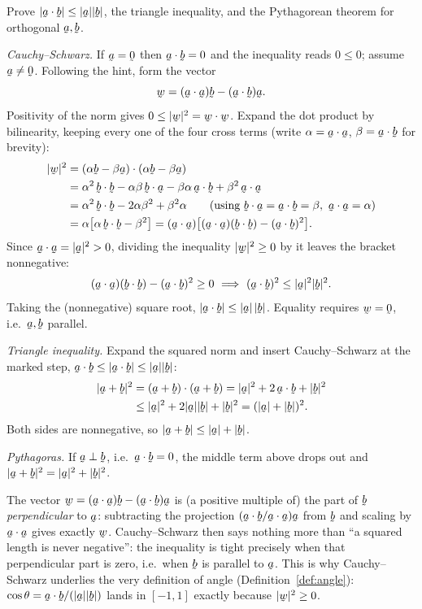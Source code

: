 \begin{problem}
Prove $|\ip\ba\bb|\le|\ba||\bb|$, the triangle inequality, and the
Pythagorean theorem for orthogonal $\ba,\bb$.
\end{problem}
\begin{solution}
\emph{Cauchy--Schwarz.} If $\ba=\bze$ then $\ip\ba\bb=0$ and the inequality
reads $0\le0$; assume $\ba\neq\bze$. Following the hint, form the vector
\[
\bw=(\ip\ba\ba)\bb-(\ip\ba\bb)\ba .
\]
Positivity of the norm gives $0\le|\bw|^2=\ip\bw\bw$. Expand the dot product
by bilinearity, keeping every one of the four cross terms (write
$\alpha=\ip\ba\ba$, $\beta=\ip\ba\bb$ for brevity):
\[
\begin{aligned}
|\bw|^2&=\ip{(\alpha\bb-\beta\ba)}{(\alpha\bb-\beta\ba)}\\
&=\alpha^2\,\ip\bb\bb-\alpha\beta\,\ip\bb\ba-\beta\alpha\,\ip\ba\bb
 +\beta^2\,\ip\ba\ba\\
&=\alpha^2\,\ip\bb\bb-2\alpha\beta^2+\beta^2\alpha
 \qquad(\text{using }\ip\bb\ba=\ip\ba\bb=\beta,\ \ip\ba\ba=\alpha)\\
&=\alpha\big[\alpha\,\ip\bb\bb-\beta^2\big]
 =(\ip\ba\ba)\big[(\ip\ba\ba)(\ip\bb\bb)-(\ip\ba\bb)^2\big].
\end{aligned}
\]
Since $\ip\ba\ba=|\ba|^2>0$, dividing the inequality $|\bw|^2\ge0$ by it
leaves the bracket nonnegative:
\[
(\ip\ba\ba)(\ip\bb\bb)-(\ip\ba\bb)^2\ge0
\ \Longrightarrow\ (\ip\ba\bb)^2\le|\ba|^2|\bb|^2 .
\]
Taking the (nonnegative) square root, $|\ip\ba\bb|\le|\ba|\,|\bb|$. Equality
requires $\bw=\bze$, i.e.\ $\ba,\bb$ parallel.

\emph{Triangle inequality.} Expand the squared norm and insert
Cauchy--Schwarz at the marked step, $\ip\ba\bb\le|\ip\ba\bb|\le|\ba||\bb|$:
\[
\begin{aligned}
|\ba+\bb|^2&=\ip{(\ba+\bb)}{(\ba+\bb)}=|\ba|^2+2\,\ip\ba\bb+|\bb|^2\\
&\le|\ba|^2+2|\ba||\bb|+|\bb|^2=(|\ba|+|\bb|)^2 .
\end{aligned}
\]
Both sides are nonnegative, so $|\ba+\bb|\le|\ba|+|\bb|$.

\emph{Pythagoras.} If $\ba\perp\bb$, i.e.\ $\ip\ba\bb=0$, the middle term
above drops out and $|\ba+\bb|^2=|\ba|^2+|\bb|^2$.
\end{solution}

\begin{remark}\label{rem:csuse}
The vector $\bw=(\ip\ba\ba)\bb-(\ip\ba\bb)\ba$ is (a positive multiple of)
the part of $\bb$ \emph{perpendicular} to $\ba$: subtracting the projection
$(\ip\ba\bb/\ip\ba\ba)\ba$ from $\bb$ and scaling by $\ip\ba\ba$ gives
exactly $\bw$. Cauchy--Schwarz then says nothing more than ``a squared
length is never negative'': the inequality is tight precisely when that
perpendicular part is zero, i.e.\ when $\bb$ is parallel to $\ba$. This is
why Cauchy--Schwarz underlies the very definition of angle
(Definition~\ref{def:angle}): $\cos\theta=\ip\ba\bb/(|\ba||\bb|)$ lands in
$[-1,1]$ exactly because $|\bw|^2\ge0$.
\end{remark}

